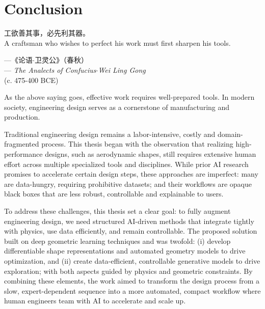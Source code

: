 \chapter{Conclusion}


\setlength{\epigraphwidth}{0.5\textwidth} 
\begin{CJK*}{UTF8}{gbsn}
    \epigraph{
        工欲善其事，必先利其器。\\
        A craftsman who wishes to perfect his work must first sharpen his tools.
    }{
        ---《论语$\cdot$卫灵公》（春秋）\\
        --- \textit{The Analects of Confucius$\cdot$Wei Ling Gong} \\
        (c. 475-400 BCE)
    } 
\end{CJK*}


As the above saying goes, effective work requires well-prepared tools. In modern society, engineering design serves as a cornerstone of manufacturing and production.

Traditional engineering design remains a labor-intensive, costly and domain-fragmented process. This thesis began with the observation that realizing high-performance designs, such as aerodynamic shapes, still requires extensive human effort across multiple specialized tools and disciplines. While prior AI research promises to accelerate certain design steps, these approaches are imperfect: many are data-hungry, requiring prohibitive datasets; and their workflows are opaque black boxes that are less robust, controllable and explainable to users.

To address these challenges, this thesis set a clear goal: to fully augment engineering design, we need structured AI-driven methods that integrate tightly with physics, use data efficiently, and remain controllable. The proposed solution built on deep geometric learning techniques and was twofold: (i) develop differentiable shape representations and automated geometry models to drive optimization, and (ii) create data-efficient, controllable generative models to drive exploration; with both aspects guided by physics and geometric constraints. By combining these elements, the work aimed to transform the design process from a slow, expert-dependent sequence into a more automated, compact workflow where human engineers team with AI to accelerate and scale up.

